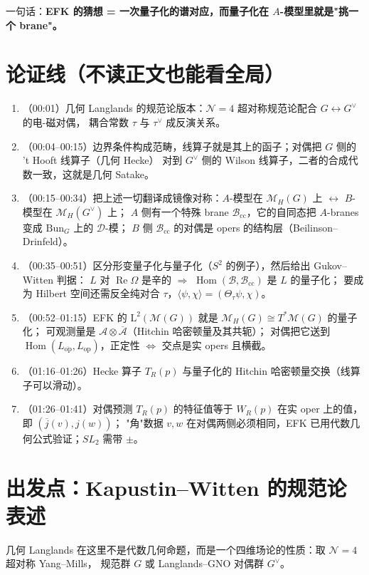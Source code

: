\documentclass[11pt,a4paper]{ctexart}
\newcommand{\Bcc}{\mathcal{B}_{\mathrm{cc}}}
\newcommand{\Loc}{\mathcal{M}_H}
\newcommand{\Bun}{\mathrm{Bun}_G}
\newcommand{\op}{\mathrm{op}}
\newcommand{\opb}{\overline{\mathrm{op}}}
\newcommand{\Hom}{\operatorname{Hom}}
\begin{document}
一句话：\textbf{EFK 的猜想 = 一次量子化的谱对应，而量子化在 $A$-模型里就是"挑一个 brane"。}

\section{论证线（不读正文也能看全局）}

\begin{enumerate}[label=\arabic*.]
\item（00:01）几何 Langlands 的规范论版本：$\mathcal{N}=4$ 超对称规范论配合 $G\leftrightarrow G^\vee$ 的电-磁对偶，
耦合常数 $\tau$ 与 $\tau^\vee$ 成反演关系。
\item（00:04–00:15）边界条件构成范畴，线算子就是其上的函子；对偶把 $G$ 侧的 't Hooft 线算子（几何 Hecke）
对到 $G^\vee$ 侧的 Wilson 线算子，二者的合成代数一致，这就是几何 Satake。
\item（00:15–00:34）把上述一切翻译成镜像对称：$A$-模型在 $\Loc(G)$ 上 $\leftrightarrow$ $B$-模型在 $\Loc(G^\vee)$ 上；
$A$ 侧有一个特殊 brane $\Bcc$，它的自同态把 $A$-branes 变成 $\Bun$ 上的 $\mathcal{D}$-模；
$B$ 侧 $\Bcc$ 的对偶是 opers 的结构层（Beilinson–Drinfeld）。
\item（00:35–00:51）区分形变量子化与量子化（$S^2$ 的例子），然后给出 Gukov–Witten 判据：
$L$ 对 $\operatorname{Re}\Omega$ 是辛的 $\Rightarrow$ $\Hom(\mathcal{B},\Bcc)$ 是 $L$ 的量子化；
要成为 Hilbert 空间还需反全纯对合 $\tau$，$\langle\psi,\chi\rangle=(\Theta_\tau\psi,\chi)$。
\item（00:52–01:15）EFK 的 $\mathrm{L}^2(\mathcal{M}(G))$ 就是 $\Loc(G)\cong T^*\mathcal{M}(G)$ 的量子化；
可观测量是 $\mathcal{A}\otimes\overline{\mathcal{A}}$（Hitchin 哈密顿量及其共轭）；
对偶把它送到 $\Hom(L_{\opb},L_{\op})$，正定性 $\Leftrightarrow$ 交点是实 opers 且横截。
\item（01:16–01:26）Hecke 算子 $T_R(p)$ 与量子化的 Hitchin 哈密顿量交换（线算子可以滑动）。
\item（01:26–01:41）对偶预测 $T_R(p)$ 的特征值等于 $W_R(p)$ 在实 oper 上的值，即 $(\overline{j}(v),j(w))$；
"角"数据 $v,w$ 在对偶两侧必须相同，EFK 已用代数几何公式验证；$SL_2$ 需带 $\pm$。
\end{enumerate}

\section{出发点：Kapustin–Witten 的规范论表述}

几何 Langlands 在这里不是代数几何命题，而是一个四维场论的性质：取 $\mathcal{N}=4$ 超对称 Yang–Mills，
规范群 $G$ 或 Langlands–GNO 对偶群 $G^\vee$。
\end{document}
